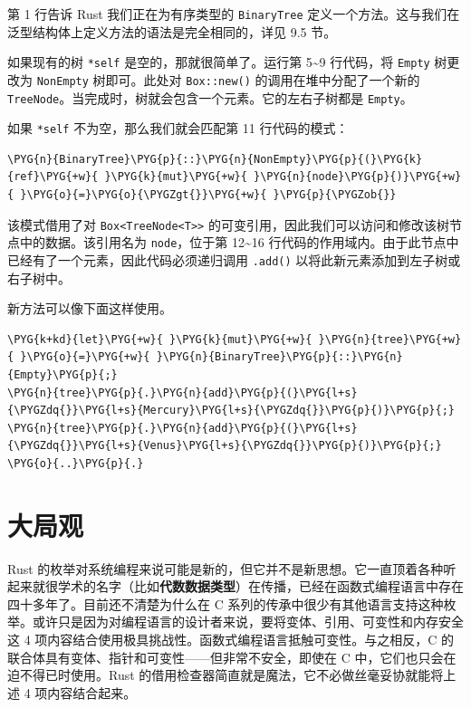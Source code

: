第 1 行告诉 Rust 我们正在为有序类型的 \texttt{BinaryTree} 定义一个方法。这与我们在泛型结构体上定义方法的语法是完全相同的，详见 9.5 节。

如果现有的树 \texttt{*self} 是空的，那就很简单了。运行第 5\textasciitilde{}9 行代码，将 \texttt{Empty} 树更改为 \texttt{NonEmpty} 树即可。此处对 \texttt{Box::new()} 的调用在堆中分配了一个新的 \texttt{TreeNode}。当完成时，树就会包含一个元素。它的左右子树都是 \texttt{Empty}。

如果 \texttt{*self} 不为空，那么我们就会匹配第 11 行代码的模式：

\begin{Verbatim}[commandchars=\\\{\},breaklines=true,breakanywhere=true,fontsize=\codefont,xleftmargin=17bp]
\PYG{n}{BinaryTree}\PYG{p}{::}\PYG{n}{NonEmpty}\PYG{p}{(}\PYG{k}{ref}\PYG{+w}{ }\PYG{k}{mut}\PYG{+w}{ }\PYG{n}{node}\PYG{p}{)}\PYG{+w}{ }\PYG{o}{=}\PYG{o}{\PYGZgt{}}\PYG{+w}{ }\PYG{p}{\PYGZob{}}
\end{Verbatim}

该模式借用了对 \texttt{Box<TreeNode<T>>} 的可变引用，因此我们可以访问和修改该树节点中的数据。该引用名为 \texttt{node}，位于第 12\textasciitilde{}16 行代码的作用域内。由于此节点中已经有了一个元素，因此代码必须递归调用 \texttt{.add()} 以将此新元素添加到左子树或右子树中。

新方法可以像下面这样使用。

\begin{Verbatim}[commandchars=\\\{\},breaklines=true,breakanywhere=true,fontsize=\codefont,xleftmargin=17bp]
\PYG{k+kd}{let}\PYG{+w}{ }\PYG{k}{mut}\PYG{+w}{ }\PYG{n}{tree}\PYG{+w}{ }\PYG{o}{=}\PYG{+w}{ }\PYG{n}{BinaryTree}\PYG{p}{::}\PYG{n}{Empty}\PYG{p}{;}
\PYG{n}{tree}\PYG{p}{.}\PYG{n}{add}\PYG{p}{(}\PYG{l+s}{\PYGZdq{}}\PYG{l+s}{Mercury}\PYG{l+s}{\PYGZdq{}}\PYG{p}{)}\PYG{p}{;}
\PYG{n}{tree}\PYG{p}{.}\PYG{n}{add}\PYG{p}{(}\PYG{l+s}{\PYGZdq{}}\PYG{l+s}{Venus}\PYG{l+s}{\PYGZdq{}}\PYG{p}{)}\PYG{p}{;}
\PYG{o}{..}\PYG{p}{.}
\end{Verbatim}

\section{大局观}

Rust 的枚举对系统编程来说可能是新的，但它并不是新思想。它一直顶着各种听起来就很学术的名字（比如\textbf{代数数据类型}）在传播，已经在函数式编程语言中存在四十多年了。目前还不清楚为什么在 C 系列的传承中很少有其他语言支持这种枚举。或许只是因为对编程语言的设计者来说，要将变体、引用、可变性和内存安全这 4 项内容结合使用极具挑战性。函数式编程语言抵触可变性。与之相反，C 的联合体具有变体、指针和可变性——但非常不安全，即使在 C 中，它们也只会在迫不得已时使用。Rust 的借用检查器简直就是魔法，它不必做丝毫妥协就能将上述 4 项内容结合起来。

